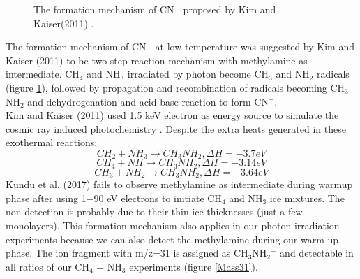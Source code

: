 \begin{figure}
\centering
{}
\caption{The formation mechanism of CN$^-$ proposed by Kim and Kaiser(2011)\cite{kim} .}
\label{fig:CNmechanism}
\end{figure}


The formation mechanism of CN$^-$ at low temperature was suggested by Kim and Kaiser (2011) to be two step reaction mechanism with methylamine as intermediate\cite{kim}. CH$_4$ and NH$_3$ irradiated by photon become CH$_3$ and NH$_2$ radicals (figure \ref{fig:CNmechanism}), followed by propagation and recombination of radicals becoming CH$_3$NH$_2$ and dehydrogenation and acid-base reaction to form CN$^-$. \\

Kim and Kaiser (2011) used 1.5 keV electron as energy source to simulate the cosmic ray induced photochemistry \cite{kim}. Despite the extra heats generated in these exothermal reactions:
\begin{equation}
CH_2 + NH_3 \rightarrow CH_3NH_2, \Delta H = -3.7 eV
\label{eq:methylamine_1}
\end{equation}
\begin{equation}
CH_4 + NH \rightarrow CH_3NH_2, \Delta H = -3.14 eV
\label{eq:methylamine_2}
\end{equation}
\begin{equation}
CH_3 + NH_2 \rightarrow CH_3NH_2, \Delta H = -3.64 eV
\label{eq:methylamine_3}
\end{equation}
Kundu et al. (2017) fails to observe methylamine as intermediate during warmup phase after using 1$-$90 eV electrons to initiate CH$_4$ and NH$_3$ ice mixtures\cite{kundu2017electron}. The non-detection is probably due to their thin ice thicknesses (just a few monolayers). This formation mechanism also applies in our photon irradiation experiments because we can also detect the methylamine during our warm-up phase. The ion fragment with m/z=31 is assigned as CH$_3$NH$_2$$^+$ and detectable in all ratios of our CH$_4$ + NH$_3$ experiments (figure \ref{Mass31}).\\

